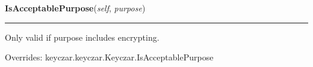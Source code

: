     \vspace{0.5ex}

\hspace{.8\funcindent}\begin{boxedminipage}{\funcwidth}

    \raggedright \textbf{IsAcceptablePurpose}(\textit{self}, \textit{purpose})

    \vspace{-1.5ex}

    \rule{\textwidth}{0.5\fboxrule}
\setlength{\parskip}{2ex}
    Only valid if purpose includes encrypting.

\setlength{\parskip}{1ex}
      Overrides: keyczar.keyczar.Keyczar.IsAcceptablePurpose

    \end{boxedminipage}

    \label{keyczar:keyczar:Encrypter:Encrypt}

    \vspace{0.5ex}

